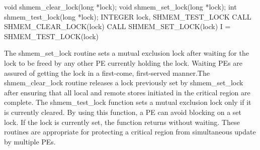 \synC
void shmem_clear_lock(long *lock);
void shmem_set_lock(long *lock);
int shmem_test_lock(long *lock);
\synF   %
INTEGER lock, SHMEM_TEST_LOCK
CALL SHMEM_CLEAR_LOCK(lock)
CALL SHMEM_SET_LOCK(lock)
I = SHMEM_TEST_LOCK(lock)

{
       The shmem\_set\_lock routine sets a mutual exclusion lock after  waiting
       for  the lock  to be freed by any other PE currently holding the lock.
       Waiting PEs  are  assured  of  getting	the  lock  in  a   first-come,
       first-served manner.The   shmem\_clear\_lock  routine releases  a  lock  previously  set  by
       shmem\_set\_lock  after  ensuring that  all  local  and  remote	stores
       initiated in the critical region are complete. The shmem\_test\_lock function sets a mutual exclusion lock only if it is
       currently cleared.  By using this function, a PE can avoid blocking  on
       a set lock.  If the lock is currently set, the function returns without
       waiting. These routines are appropriate for protecting a critical  region  from
       simultaneous  update  by multiple  PEs.	  
}
{

}

\eAPI